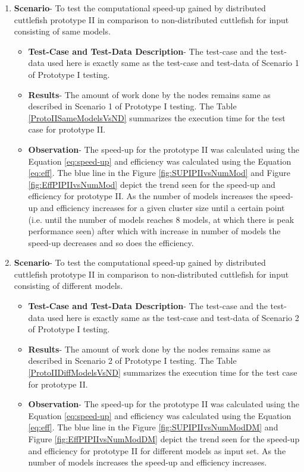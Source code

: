 \begin{enumerate}
\item{\textbf{Scenario}}- To test the computational speed-up gained by distributed cuttlefish prototype II in comparison to non-distributed cuttlefish for input consisting of same models.
\begin{itemize}
\item{\textbf{Test-Case and Test-Data Description}}- The test-case and the test-data used here is exactly same as the test-case and test-data of Scenario 1 of Prototype I testing.
\item{\textbf{Results}}- The amount of work done by the nodes remains same as described in Scenario 1 of Prototype I testing. The Table \ref{ProtoIISameModelsVsND} summarizes the execution time for the test case for prototype II.
\item{\textbf{Observation}}- The speed-up for the prototype II was calculated using the Equation \ref{eq:speed-up} and efficiency was calculated using the Equation \ref{eq:eff}. The blue line in the Figure \ref{fig:SUPIPIIvsNumMod} and Figure \ref{fig:EffPIPIIvsNumMod} depict the trend seen for the speed-up and efficiency for prototype II. As the number of models increases the speed-up and efficiency increases for a given cluster size until a certain point (i.e. until the number of models reaches 8 models, at which there is peak performance seen) after which with increase in number of models the speed-up decreases and so does the efficiency.  
\end{itemize}

\item{\textbf{Scenario}}- To test the computational speed-up gained by distributed cuttlefish prototype II in comparison to non-distributed cuttlefish for input consisting of different models.
\begin{itemize}
\item{\textbf{Test-Case and Test-Data Description}}- The test-case and the test-data used here is exactly same as the test-case and test-data of Scenario 2 of Prototype I testing.
\item{\textbf{Results}}- The amount of work done by the nodes remains same as described in Scenario 2 of Prototype I testing. The Table \ref{ProtoIIDiffModelsVsND} summarizes the execution time for the test case for prototype II.
\item{\textbf{Observation}}-  The speed-up for the prototype II was calculated using the Equation \ref{eq:speed-up} and efficiency was calculated using the Equation \ref{eq:eff}. The blue line in the Figure \ref{fig:SUPIPIIvsNumModDM} and Figure \ref{fig:EffPIPIIvsNumModDM} depict the trend seen for the speed-up and efficiency for prototype II for different models as input set. As the number of models increases the speed-up and efficiency increases.
\end{itemize}
\end{enumerate}


